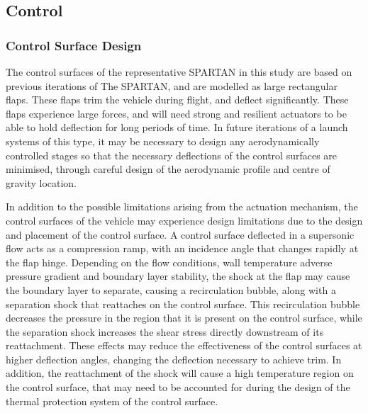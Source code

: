 \subsection{Control}


\subsubsection{Control Surface Design}


The control surfaces of the representative SPARTAN in this study are based on previous iterations of The SPARTAN\cite{Preller2017b}, and are modelled as large rectangular flaps. These flaps trim the vehicle during flight, and deflect significantly. These flaps experience large forces, and will need strong and resilient actuators to be able to hold deflection for long periods of time. In future iterations of a launch systems of this type, it may be necessary to design any aerodynamically controlled stages so that the necessary deflections of the control surfaces are minimised, through careful design of the aerodynamic profile and centre of gravity location.

In addition to the possible limitations arising from the actuation mechanism, the control surfaces of the vehicle may experience design limitations due to the design and placement of the control surface.
A control surface deflected in a supersonic flow acts as a compression ramp, with an incidence angle that changes rapidly at the flap hinge. Depending on the flow conditions, wall temperature adverse pressure gradient and boundary layer stability, the shock at the flap may cause the boundary layer to separate, causing a recirculation bubble, along with a separation shock that reattaches on the control surface\cite{Marini2001}. This recirculation bubble decreases the pressure in the region that it is present on the control surface, while the separation shock increases the shear stress directly downstream of its reattachment\cite{Marini2001}. These effects may reduce the effectiveness of the control surfaces at higher deflection angles, changing the deflection necessary to achieve trim. In addition, the reattachment of the shock will cause a high temperature region on the control surface, that may need to be accounted for during the design of the thermal protection system of the control surface. 


